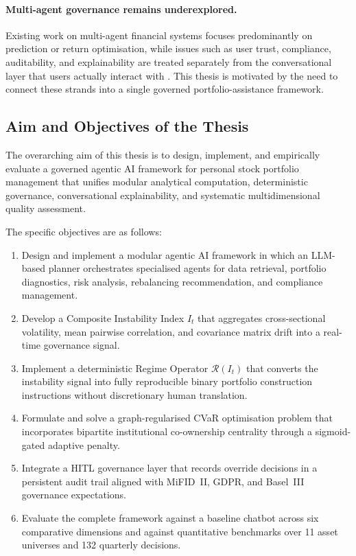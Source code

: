 \documentclass[11pt]{article}
\begin{document}
\paragraph{Multi-agent governance remains underexplored.} Existing work on multi-agent financial systems focuses predominantly on prediction or return optimisation, while issues such as user trust, compliance, auditability, and explainability are treated separately from the conversational layer that users actually interact with \cite{jennings1998,wooldridge2009,li2023}. This thesis is motivated by the need to connect these strands into a single governed portfolio-assistance framework.

\subsection{Aim and Objectives of the Thesis}
The overarching aim of this thesis is to design, implement, and empirically evaluate a governed agentic AI framework for personal stock portfolio management that unifies modular analytical computation, deterministic governance, conversational explainability, and systematic multidimensional quality assessment.

The specific objectives are as follows:
\begin{enumerate}
  \item Design and implement a modular agentic AI framework in which an LLM-based planner orchestrates specialised agents for data retrieval, portfolio diagnostics, risk analysis, rebalancing recommendation, and compliance management.
  \item Develop a Composite Instability Index $I_t$ that aggregates cross-sectional volatility, mean pairwise correlation, and covariance matrix drift into a real-time governance signal.
  \item Implement a deterministic Regime Operator $\mathcal{R}(I_t)$ that converts the instability signal into fully reproducible binary portfolio construction instructions without discretionary human translation.
  \item Formulate and solve a graph-regularised CVaR optimisation problem that incorporates bipartite institutional co-ownership centrality through a sigmoid-gated adaptive penalty.
  \item Integrate a HITL governance layer that records override decisions in a persistent audit trail aligned with MiFID~II, GDPR, and Basel~III governance expectations.
  \item Evaluate the complete framework against a baseline chatbot across six comparative dimensions and against quantitative benchmarks over 11 asset universes and 132 quarterly decisions.
\end{enumerate}
\end{document}
